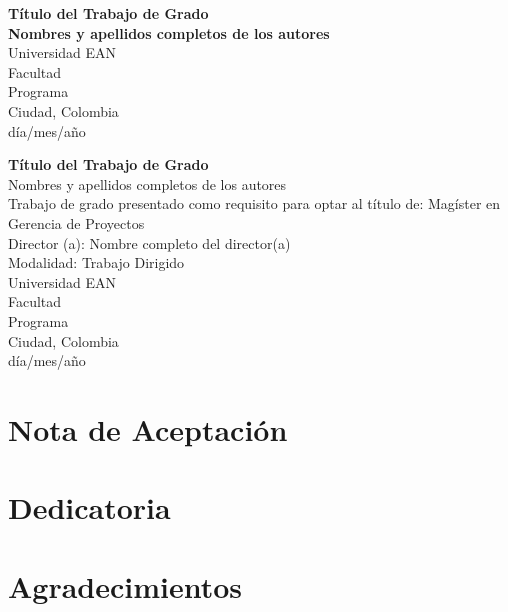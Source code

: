 \documentclass[12pt]{article}
\newcommand{\chapterbreak}{\clearpage \thispagestyle{fancy}}
\begin{document}
\begin{titlepage}
\centering
\vspace*{1cm}
\textbf{\LARGE Título del Trabajo de Grado}\\[1.5cm]

\textbf{\Large Nombres y apellidos completos de los autores}\\[2cm]

Universidad EAN\\
Facultad\\
Programa\\
Ciudad, Colombia\\
d\'ia/mes/a\~no
\end{titlepage}

\chapterbreak

\begin{center}
\textbf{\Large Título del Trabajo de Grado}\\[1.5cm]

Nombres y apellidos completos de los autores\\[1cm]

Trabajo de grado presentado como requisito para optar al título de: Magíster en Gerencia de Proyectos\\[0.5cm]

Director (a): Nombre completo del director(a)\\
Modalidad: Trabajo Dirigido\\[1.5cm]

Universidad EAN\\
Facultad\\
Programa\\
Ciudad, Colombia\\
d\'ia/mes/a\~no
\end{center}

\chapterbreak
\section*{Nota de Aceptación}


\chapterbreak

\section*{Dedicatoria}


\chapterbreak
\section*{Agradecimientos}

\end{document}
